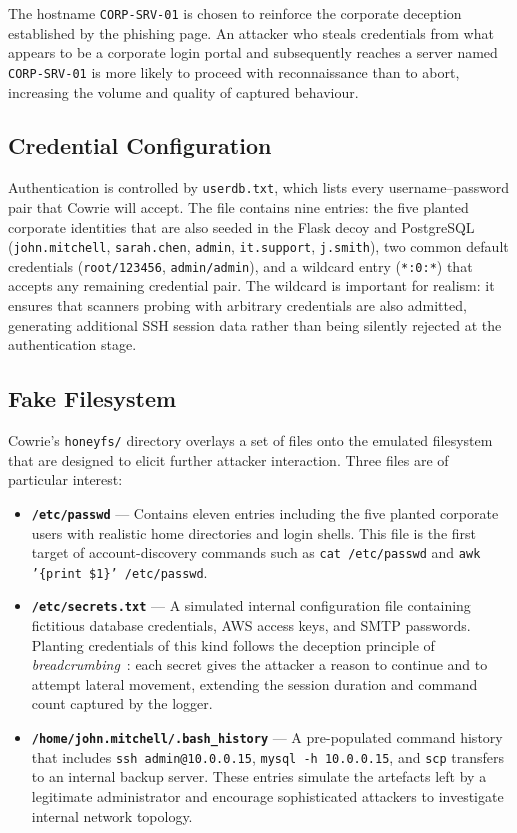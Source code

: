 The hostname \texttt{CORP-SRV-01} is chosen to reinforce the corporate
deception established by the phishing page. An attacker who steals credentials
from what appears to be a corporate login portal and subsequently reaches a
server named \texttt{CORP-SRV-01} is more likely to proceed with reconnaissance
than to abort, increasing the volume and quality of captured behaviour.

\subsection{Credential Configuration}

Authentication is controlled by \texttt{userdb.txt}, which lists every
username–password pair that Cowrie will accept. The file contains nine entries:
the five planted corporate identities that are also seeded in the Flask decoy
and PostgreSQL (\texttt{john.mitchell}, \texttt{sarah.chen}, \texttt{admin},
\texttt{it.support}, \texttt{j.smith}), two common default credentials
(\texttt{root/123456}, \texttt{admin/admin}), and a wildcard entry
(\texttt{*:0:*}) that accepts any remaining credential pair. The wildcard is
important for realism: it ensures that scanners probing with arbitrary
credentials are also admitted, generating additional SSH session data rather
than being silently rejected at the authentication stage.

\subsection{Fake Filesystem}

Cowrie's \texttt{honeyfs/} directory overlays a set of files onto the emulated
filesystem that are designed to elicit further attacker interaction. Three files
are of particular interest:

\begin{itemize}
    \item \textbf{\texttt{/etc/passwd}} — Contains eleven entries including the
    five planted corporate users with realistic home directories and login
    shells. This file is the first target of account-discovery commands such as
    \texttt{cat /etc/passwd} and \texttt{awk '\{print \$1\}' /etc/passwd}.

    \item \textbf{\texttt{/etc/secrets.txt}} — A simulated internal
    configuration file containing fictitious database credentials, AWS access
    keys, and SMTP passwords. Planting credentials of this kind follows the
    deception principle of \emph{breadcrumbing}~\cite{LD08}: each secret gives
    the attacker a reason to continue and to attempt lateral movement, extending
    the session duration and command count captured by the logger.

    \item \textbf{\texttt{/home/john.mitchell/.bash\_history}} — A pre-populated
    command history that includes \texttt{ssh admin@10.0.0.15},
    \texttt{mysql -h 10.0.0.15}, and \texttt{scp} transfers to an internal
    backup server. These entries simulate the artefacts left by a legitimate
    administrator and encourage sophisticated attackers to investigate internal
    network topology.
\end{itemize}

